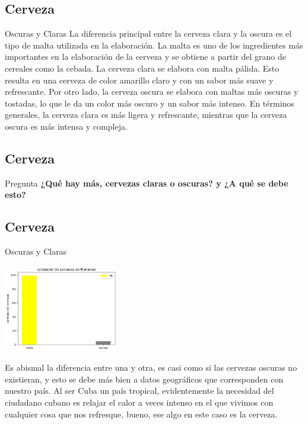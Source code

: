 \subsection{Cerveza}
\begin{frame}[fragile]{Oscuras y Claras}
  La diferencia principal entre la cerveza clara y la oscura es el tipo de malta utilizada en la elaboración. 
  La malta es uno de los ingredientes más importantes en la elaboración de la cerveza y se obtiene a partir del grano de cereales como la cebada. 
  La cerveza clara se elabora con malta pálida. 
  Esto resulta en una cerveza de color amarillo claro y con un sabor más suave y refrescante. 
  Por otro lado, la cerveza oscura se elabora con maltas más oscuras y tostadas, lo que le da un color más oscuro y un sabor más intenso. 
  En términos generales, la cerveza clara es más ligera y refrescante, mientras que la cerveza oscura es más intensa y compleja.
  
\end{frame}

\subsection{Cerveza}
\begin{frame}[fragile]{Pregunta}
  \textbf{\Large¿Qué hay más, cervezas claras o oscuras? y ¿A qué se debe esto?}
  
\end{frame}

\subsection{Cerveza}
\begin{frame}[fragile]{Oscuras y Claras}
  \begin{center}
    \includegraphics[width=5cm]{c y o.png}
    \end{center}
    Es abismal la diferencia entre una y otra, es casi como si las cervezas oscuras no existieran, y esto se debe más bien a datos geográficos que corresponden con nuestro país. 
    Al ser Cuba un país tropical, evidentemente la necesidad del ciudadano cubano es relajar el calor a veces intenso en el que vivimos con cualquier cosa que nos refresque, bueno, ese algo en este caso es la cerveza. 
\end{frame}

